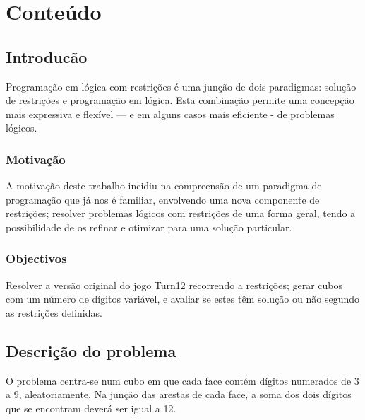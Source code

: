 %
%

\chapter{Conteúdo}
\label{cont}

\section{Introducão}
\label{introduction} %

Programação em lógica com restrições é uma junção de dois paradigmas: solução de restrições e programação em lógica. Esta combinação permite uma concepção mais expressiva e flexível — e em alguns casos mais eficiente - de problemas lógicos.

\subsection{Motivação}
\label{sec:1}
A motivação deste trabalho incidiu na compreensão de um paradigma de programação que já nos é familiar, envolvendo uma nova componente de restrições; resolver problemas lógicos com restrições de uma forma geral, tendo a possibilidade de os refinar e otimizar para uma solução particular.

\subsection{Objectivos}
\label{sec:2}
Resolver a versão original do jogo Turn12 recorrendo a restrições; gerar cubos com um número de dígitos variável, e avaliar se estes têm solução ou não segundo as restrições definidas.


\section{Descrição do problema}
\label{sec:3}
O problema centra-se num cubo em que cada face contém dígitos numerados de 3 a 9, aleatoriamente. Na junção das arestas de cada face, a soma dos dois dígitos que se encontram deverá ser igual a 12.

